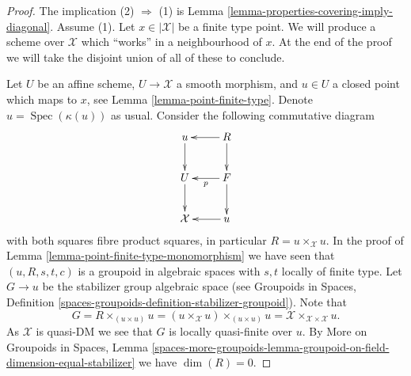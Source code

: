 \documentclass[10pt,a4paper]{amsart}
\theoremstyle{plain}
\theoremstyle{definition}
\theoremstyle{remark}
\numberwithin{equation}{subsection}
\def\Spec{\mathop{\mathrm{Spec}}}
\begin{document}
\begin{proof}
The implication (2) $\Rightarrow$ (1) is
Lemma \ref{lemma-properties-covering-imply-diagonal}.
Assume (1).
Let $x \in |\mathcal{X}|$ be a finite type point. We will produce a scheme
over $\mathcal{X}$ which ``works'' in a neighbourhood of $x$. At the end
of the proof we will take the disjoint union of all of these to conclude.

\medskip\noindent
Let $U$ be an affine scheme, $U \to \mathcal{X}$ a smooth morphism, and
$u \in U$ a closed point which maps to $x$, see
Lemma \ref{lemma-point-finite-type}.
Denote $u = \Spec(\kappa(u))$ as usual. Consider the following
commutative diagram
$$
\xymatrix{
u \ar[d] & R \ar[l] \ar[d] \\
U \ar[d] & F \ar[d] \ar[l]^p \\
\mathcal{X} & u \ar[l]
}
$$
with both squares fibre product squares, in particular
$R = u \times_\mathcal{X} u$. In the proof of
Lemma \ref{lemma-point-finite-type-monomorphism}
we have seen that $(u, R, s, t, c)$ is a groupoid in algebraic spaces
with $s, t$ locally of finite type. Let $G \to u$ be the stabilizer group
algebraic space (see
Groupoids in Spaces, Definition
\ref{spaces-groupoids-definition-stabilizer-groupoid}).
Note that
$$
G = R \times_{(u \times u)} u =
(u \times_\mathcal{X} u) \times_{(u \times u)} u =
\mathcal{X} \times_{\mathcal{X} \times \mathcal{X}} u.
$$
As $\mathcal{X}$ is quasi-DM we see that
$G$ is locally quasi-finite over $u$. By
More on Groupoids in Spaces, Lemma
\ref{spaces-more-groupoids-lemma-groupoid-on-field-dimension-equal-stabilizer}
we have $\dim(R) = 0$.


\end{proof}
\end{document}
